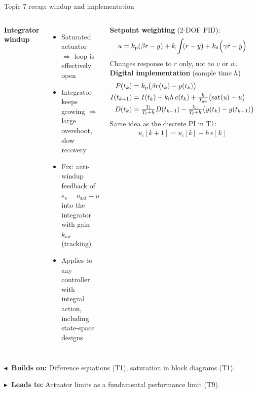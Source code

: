 \documentclass[10pt]{beamer-control}
\newcommand\LINKS[2]{%
  \par\vfill
  {\scriptsize\setlength\fboxsep{3pt}%
  \colorbox{AUHighlight!10}{\parbox{\dimexpr\linewidth-6pt\relax}{%
    \textbf{\color{AUHighlight}$\blacktriangleleft$~Builds on:} #1\par
    \textbf{\color{AUHighlight}$\blacktriangleright$~Leads to:} #2%
    \hfill\hyperlink{coursemap}{\beamerbutton{Course map}}}}}%
}
\begin{document}
\begin{frame}{Topic 7 recap: windup and implementation}
  \begin{columns}[t]
    \footnotesize
    \textbf{Integrator windup}
    \begin{itemize}
      \item Saturated actuator $\Rightarrow$ loop is effectively open
      \item Integrator keeps growing $\Rightarrow$ large overshoot, slow recovery
      \item Fix: \alert{anti-windup} feedback of $e_s = u_{\text{sat}} - u$ into the integrator with gain $k_{\text{aw}}$ (tracking)
      \item Applies to any controller with integral action, including state-space designs
    \end{itemize}
    \textbf{Setpoint weighting} (2-DOF PID):
    \begin{align*}
      u = k_{\mathrm{p}}(\beta r - y) + k_{\mathrm{i}}\!\int\!(r-y) + k_{\mathrm{d}}\Bigl(\gamma\dot r - \dot y\Bigr)
    \end{align*}
    Changes response to $r$ only, not to $v$ or $w$.
    \footnotesize
    \textbf{Digital implementation} (sample time $h$)
    \begin{align*}
      P(t_k) &= k_{\mathrm{p}}\bigl(\beta r(t_k) - y(t_k)\bigr)\\
      I(t_{k+1}) &= I(t_k) + k_{\mathrm{i}} h\, e(t_k) + \tfrac{h}{T_{\text{aw}}}\bigl(\mathrm{sat}(u)-u\bigr)\\
      D(t_k) &= \tfrac{T_{\mathrm{f}}}{T_{\mathrm{f}}+h}D(t_{k-1}) - \tfrac{k_{\mathrm{d}}}{T_{\mathrm{f}}+h}\bigl(y(t_k)-y(t_{k-1})\bigr)
    \end{align*}
    Same idea as the discrete PI in T1:
    \begin{align*}
      u_i[k+1] = u_i[k] + h\,e[k]
    \end{align*}
  \end{columns}
  \LINKS{Difference equations (T1), saturation in block diagrams (T1).}{Actuator limits as a fundamental performance limit (T9).}
\end{frame}

\end{document}
